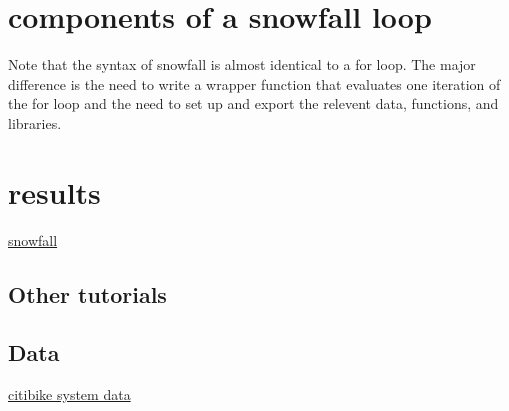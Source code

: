 \documentclass[]{article}
\begin{document}
\section{components of a snowfall
loop}\label{components-of-a-snowfall-loop}

Note that the syntax of snowfall is almost identical to a for loop. The
major difference is the need to write a wrapper function that evaluates
one iteration of the for loop and the need to set up and export the
relevent data, functions, and libraries.

\section{results}\label{results}

\href{http://CRAN.R-project.org/package=snowfall}{snowfall}

\subsection{Other tutorials}\label{other-tutorials}

\subsection{Data}\label{data-1}

\href{https://www.citibikenyc.com/system-data}{citibike system data}
\end{document}
